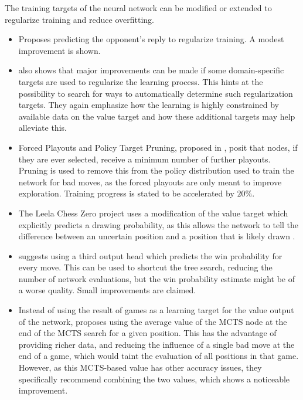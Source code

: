 \documentclass[12pt,onecolumn,oneside,titlepage]{article}
\begin{document}
The training targets of the neural network can be modified or extended to regularize training and reduce overfitting.

\begin{itemize}
 \item \cite{wu2019accelerating} Proposes predicting the opponent's reply to regularize training. A modest improvement is shown.
 \item \cite{wu2019accelerating} also shows that major improvements can be made if some domain-specific targets are used to regularize the learning process. 
 This hints at the possibility to search for ways to automatically determine such regularization targets.
 They again emphasize how the learning is highly constrained by available data on the value target and how these additional targets may help alleviate this.
 \item Forced Playouts and Policy Target Pruning, proposed in \cite{wu2019accelerating}, posit that nodes, 
 if they are ever selected, receive a minimum number of further playouts. Pruning is used to remove this from the policy distribution used to train the network for bad moves,
 as the forced playouts are only meant to improve exploration. Training progress is stated to be accelerated by $20\%$.
 \item The Leela Chess Zero project uses a modification of the value target which explicitly predicts a drawing probability,
 as this allows the network to tell the difference between an uncertain position and a position that is likely drawn \cite{leela0wdl}.
 \item \cite{anonymous2020threehead} suggests using a third output head which predicts the win probability for every move. This can be used to shortcut the tree search, reducing the number of network evaluations, but the win probability estimate might be of a worse quality.
  Small improvements are claimed.
 \item Instead of using the result of games as a learning target for the value output of the network, \cite{oracledevs6} 
 proposes using the average value of the MCTS node at the end of the MCTS search for a given position. This has the advantage of providing richer data,
 and reducing the influence of a single bad move at the end of a game, which would taint the evaluation of all positions in that game. 
 However, as this MCTS-based value has other accuracy issues, they specifically recommend combining the two values, which shows a noticeable improvement.
\end{itemize}
\end{document}
